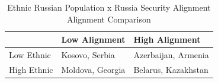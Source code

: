\begin{table}[t]
\caption*{
{\fontsize{20}{25}\selectfont  Ethnic Russian Population x Russia Security Alignment\fontsize{12}{15}\selectfont } \\ 
{\fontsize{14}{17}\selectfont  Alignment Comparison\fontsize{12}{15}\selectfont }
} 
\fontsize{12.0pt}{14.0pt}\selectfont
\begin{tabular*}{\linewidth}{@{\extracolsep{\fill}}lll}
\toprule
 & Low Alignment & High Alignment \\ 
\midrule\addlinespace[2.5pt]
Low Ethnic & {Kosovo, Serbia} & {Azerbaijan, Armenia} \\ 
High Ethnic & {Moldova, Georgia} & {Belarus, Kazakhstan} \\ 
\bottomrule
\end{tabular*}
\end{table}

